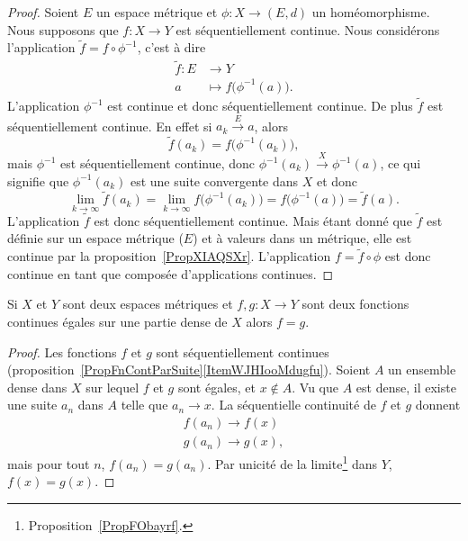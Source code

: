 \begin{proof}
    Soient \( E\) un espace métrique et \( \phi\colon X\to (E,d)\) un homéomorphisme. Nous supposons que \( f\colon X\to Y\) est séquentiellement continue. Nous considérons l'application \( \tilde f=f\circ\phi^{-1}\), c'est à dire
    \begin{equation}
        \begin{aligned}
            \tilde f\colon E&\to Y \\
            a&\mapsto f\big( \phi^{-1}(a) \big).
        \end{aligned}
    \end{equation}
    L'application \( \phi^{-1}\) est continue et donc séquentiellement continue. De plus \( \tilde f\) est séquentiellement continue. En effet si \( a_k\stackrel{E}{\longrightarrow}a\), alors
    \begin{equation}
        \tilde f(a_k)=f\big( \phi^{-1}(a_k) \big),
    \end{equation}
    mais \( \phi^{-1}\) est séquentiellement continue, donc \( \phi^{-1}(a_k)\stackrel{X}{\longrightarrow}\phi^{-1}(a)\), ce qui signifie que \( \phi^{-1}(a_k)\) est une suite convergente dans \( X\) et donc
    \begin{equation}
        \lim_{k\to \infty} \tilde f(a_k)=\lim_{k\to \infty} f\big( \phi^{-1}(a_k) \big)=f\big( \phi^{-1}(a) \big)=\tilde f(a).
    \end{equation}
    L'application \( \tilde f\) est donc séquentiellement continue. Mais étant donné que \( \tilde f\) est définie sur un espace métrique (\( E\)) et à valeurs dans un métrique, elle est continue par la proposition~\ref{PropXIAQSXr}. L'application \( f=\tilde f\circ\phi\) est donc continue en tant que composée d'applications continues.
\end{proof}

\begin{proposition} \label{PropCJGIooZNpnGF}
    Si \( X\) et \( Y\) sont deux espaces métriques et \( f,g\colon X\to Y\) sont deux fonctions continues égales sur une partie dense de \( X\) alors \( f=g\).
\end{proposition}

\begin{proof}
    Les fonctions \( f\) et \( g\) sont séquentiellement continues (proposition~\ref{PropFnContParSuite}\ref{ItemWJHIooMdugfu}). Soient \( A\) un ensemble dense dans \( X\) sur lequel \( f\) et \( g\) sont égales, et \( x\notin A\). Vu que \( A\) est dense, il existe une suite \( a_n\) dans \( A\) telle que \( a_n\to x\). La séquentielle continuité de \( f\) et \( g\) donnent
    \begin{subequations}
        \begin{align}
            f(a_n)\to f(x)\\
            g(a_n)\to g(x),
        \end{align}
    \end{subequations}
    mais pour tout \( n\), \( f(a_n)=g(a_n)\). Par unicité de la limite\footnote{Proposition~\ref{PropFObayrf}.} dans \( Y\), \( f(x)=g(x)\).
\end{proof}

